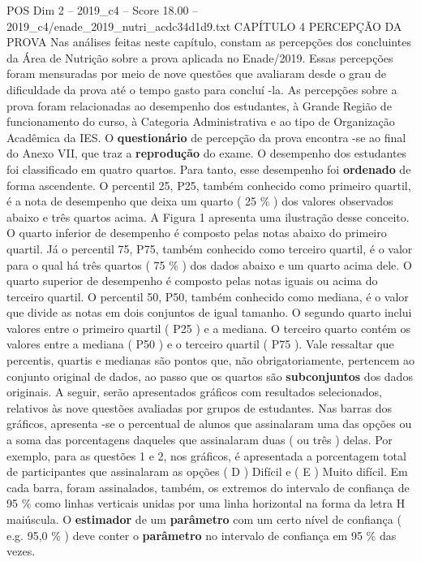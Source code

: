 \begin{textsample}{POS Dim 2 – 2019\_c4 – Score 18.00 – 2019\_c4/enade\_2019\_nutri\_acdc34d1d9.txt}  \label{ex:f2_pos_043}
CAPÍTULO 4 PERCEPÇÃO DA PROVA Nas análises feitas neste capítulo, constam as percepções dos concluintes da Área de Nutrição sobre a prova aplicada no Enade/2019.
Essas percepções foram mensuradas por meio de nove questões que avaliaram desde o grau de dificuldade da prova até o tempo gasto para concluí -la.
As percepções sobre a prova foram relacionadas ao desempenho dos estudantes, à Grande Região de funcionamento do curso, à Categoria Administrativa e ao tipo de Organização Acadêmica da IES.
O \textbf{questionário} de percepção da prova encontra -se ao final do Anexo VII, que traz a \textbf{reprodução} do exame.
O desempenho dos estudantes foi classificado em quatro quartos.
Para tanto, esse desempenho foi \textbf{ordenado} de forma ascendente.
O percentil 25, P25, também conhecido como primeiro quartil, é a nota de desempenho que deixa um quarto ( 25 \% ) dos valores observados abaixo e três quartos acima.
A Figura 1 apresenta uma ilustração desse conceito.
O quarto inferior de desempenho é composto pelas notas abaixo do primeiro quartil.
Já o percentil 75, P75, também conhecido como terceiro quartil, é o valor para o qual há três quartos ( 75 \% ) dos dados abaixo e um quarto acima dele.
O quarto superior de desempenho é composto pelas notas iguais ou acima do terceiro quartil.
O percentil 50, P50, também conhecido como mediana, é o valor que divide as notas em dois conjuntos de igual tamanho.
O segundo quarto inclui valores entre o primeiro quartil ( P25 ) e a mediana.
O terceiro quarto contém os valores entre a mediana ( P50 ) e o terceiro quartil ( P75 ).
Vale ressaltar que percentis, quartis e medianas são pontos que, não obrigatoriamente, pertencem ao conjunto original de dados, ao passo que os quartos são \textbf{subconjuntos} dos dados originais.
A seguir, serão apresentados gráficos com resultados selecionados, relativos às nove questões avaliadas por grupos de estudantes.
Nas barras dos gráficos, apresenta -se o percentual de alunos que assinalaram uma das opções ou a soma das porcentagens daqueles que assinalaram duas ( ou três ) delas.
Por exemplo, para as questões 1 e 2, nos gráficos, é apresentada a porcentagem total de participantes que assinalaram as opções ( D ) Difícil e ( E ) Muito difícil.
Em cada barra, foram assinalados, também, os extremos do intervalo de confiança de 95 \% como linhas verticais unidas por uma linha horizontal na forma da letra H maiúscula.
O \textbf{estimador} de um \textbf{parâmetro} com um certo nível de confiança ( e.g. 95,0 \% ) deve conter o \textbf{parâmetro} no intervalo de confiança em 95 \% das vezes.

\end{textsample}
